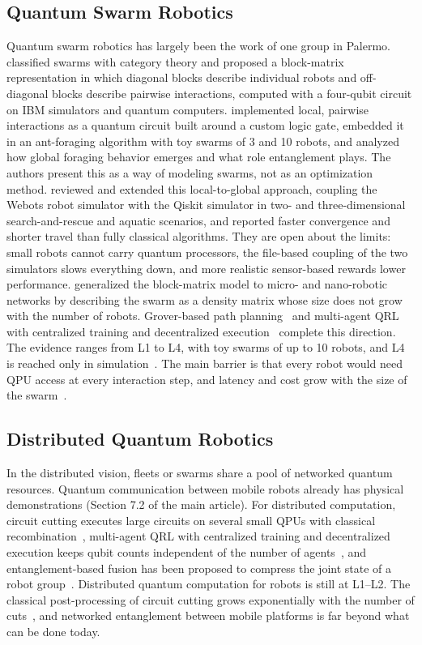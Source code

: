 \documentclass[acmsmall,screen,review]{acmart}
\begin{document}
\subsection*{Quantum Swarm Robotics}
Quantum swarm robotics has largely been the work of one group in Palermo. \citet{Mannone2022} classified swarms with category theory and proposed a block-matrix representation in which diagonal blocks describe individual robots and off-diagonal blocks describe pairwise interactions, computed with a four-qubit circuit on IBM simulators and quantum computers. \citet{Mannone2023} implemented local, pairwise interactions as a quantum circuit built around a custom logic gate, embedded it in an ant-foraging algorithm with toy swarms of 3 and 10 robots, and analyzed how global foraging behavior emerges and what role entanglement plays. The authors present this as a way of modeling swarms, not as an optimization method. \citet{Mannone2025} reviewed and extended this local-to-global approach, coupling the Webots robot simulator with the Qiskit simulator in two- and three-dimensional search-and-rescue and aquatic scenarios, and reported faster convergence and shorter travel than fully classical algorithms. They are open about the limits: small robots cannot carry quantum processors, the file-based coupling of the two simulators slows everything down, and more realistic sensor-based rewards lower performance. \citet{Mannone2025b} generalized the block-matrix model to micro- and nano-robotic networks by describing the swarm as a density matrix whose size does not grow with the number of robots. Grover-based path planning~\cite{Chella2023} and multi-agent QRL with centralized training and decentralized execution~\cite{Yun2022} complete this direction. The evidence ranges from L1 to L4, with toy swarms of up to 10 robots, and L4 is reached only in simulation~\cite{Mannone2025}. The main barrier is that every robot would need QPU access at every interaction step, and latency and cost grow with the size of the swarm~\cite{Ravi2021}.


\subsection*{Distributed Quantum Robotics}
In the distributed vision, fleets or swarms share a pool of networked quantum resources. Quantum communication between mobile robots already has physical demonstrations (Section 7.2 of the main article). For distributed computation, circuit cutting executes large circuits on several small QPUs with classical recombination~\cite{Tang2021}, multi-agent QRL with centralized training and decentralized execution keeps qubit counts independent of the number of agents~\cite{Yun2022}, and entanglement-based fusion has been proposed to compress the joint state of a robot group~\cite{Yan2021}. Distributed quantum computation for robots is still at L1--L2. The classical post-processing of circuit cutting grows exponentially with the number of cuts~\cite{Tang2021}, and networked entanglement between mobile platforms is far beyond what can be done today.
\end{document}
